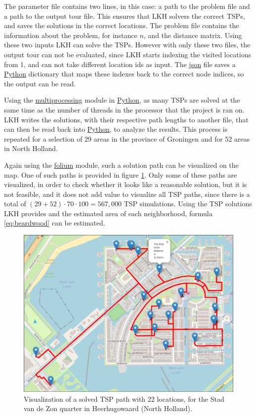 \documentclass[12pt]{article}
\numberwithin{equation}{section}
\newcommand{\1}[1]{\,I_{#1}} %
\begin{document}
The parameter file contains two lines, in this case: a path to the problem file and a path to the
output tour file. This ensures that LKH solvers the correct TSPs, and saves the solutions in the 
correct locations. The problem file contains the information about the problem, for instance
$n$, and the distance matrix. Using these two inputs LKH can solve the TSPs. However with only these 
two files, the output tour can not be evaluated, since LKH starts indexing the visited locations
from 1, and can not take different location ids as input. The \url{json} file saves a \url{Python}
dictionary that maps these indexes back to the correct node indices, so the output can be read.

Using the \url{multiprocessing} module in \url{Python}, as many TSPs are solved at the same time
as the number of threads in the processor that the project is ran on. LKH writes the solutions,
with their respective path lengths to another file, that can then be read back into \url{Python},
to analyze the results. This process is repeated for a selection of 29 areas in the province of
Groningen and for 52 areas in North Holland.

Again using the \url{folium} module, such a solution path can be visualized on the map. One of such
paths is provided in figure \ref{fig:tsp_stadvdzon}. Only some of these paths are visualized,
in order to check whether it looks like a reasonable solution, but it is not feasible, and it does
not add value to visualize all TSP paths, since there is a total of 
$(29+52)\cdot70\cdot100=567,000$ TSP simulations.
Using the TSP solutions LKH provides and the estimated area of each neighborhood, formula 
\ref{eq:beardwood} can be estimated.
\begin{figure}[H]
  \caption{Visualization of a solved TSP path with 22 locations, for the Stad van de Zon quarter in 
  Heerhugowaard (North Holland).}
  \label{fig:tsp_stadvdzon}
  \includegraphics[width=\textwidth]{Pictures/TSP_22_Stad_van_de_Zon.png}
\end{figure}
\end{document}
